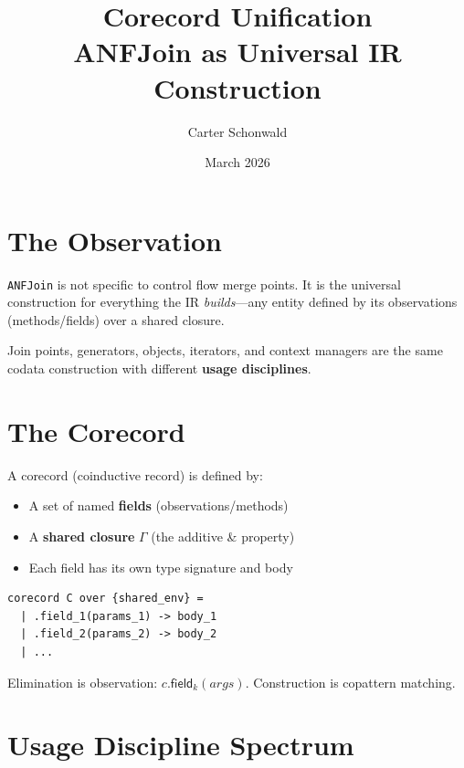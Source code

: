 \documentclass[11pt,a4paper]{article}
\title{\textbf{Corecord Unification}\\[0.3em]
\large ANFJoin as Universal IR Construction}
\author{Carter Schonwald}
\date{March 2026}
\begin{document}
\maketitle

\section{The Observation}

\texttt{ANFJoin} is not specific to control flow merge points. It is
the universal construction for everything the IR \emph{builds}---any
entity defined by its observations (methods/fields) over a shared
closure.

Join points, generators, objects, iterators, and context managers
are the same codata construction with different \textbf{usage
disciplines}.

\section{The Corecord}

A corecord (coinductive record) is defined by:
\begin{itemize}[nosep]
  \item A set of named \textbf{fields} (observations/methods)
  \item A \textbf{shared closure} $\Gamma$ (the additive \& property)
  \item Each field has its own type signature and body
\end{itemize}

\begin{lstlisting}
corecord C over {shared_env} =
  | .field_1(params_1) -> body_1
  | .field_2(params_2) -> body_2
  | ...
\end{lstlisting}

Elimination is observation: $c.\mathsf{field}_k(\mathit{args})$.
Construction is copattern matching.

\section{Usage Discipline Spectrum}
\end{document}
